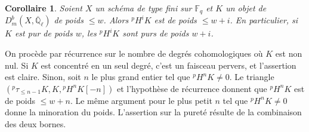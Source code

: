\documentclass[12pt,a4paper]{article}
\theoremstyle{plain}
\newtheorem{corollary}[theorem]{Corollaire}
\theoremstyle{definition}
\begin{document}
\begin{corollary}\label{cor:5.4.7}
Soient $X$ un sch\'{e}ma de type fini sur $\mathbb{F}_{q}$ et $K$ un objet de $D_{m}^{b}(X, \overline{\mathbb{Q}}_{\ell})$ de poids $\leq w$. Alors ${}^{p}H^{i}K$ est de poids $\leq w+i$. En particulier, si $K$ est pur de poids $w$, les ${}^{p}H^{i}K$ sont purs de poids $w+i$.
\end{corollary}

On proc\`{e}de par r\'{e}currence sur le nombre de degr\'{e}s cohomologiques o\`{u} $K$ est non nul. Si $K$ est concentr\'{e} en un seul degr\'{e}, c'est un faisceau pervers, et l'assertion est claire. Sinon, soit $n$ le plus grand entier tel que ${}^{p}H^{n}K \neq 0$. Le triangle $({}^{p}\tau_{\leq n-1}K, K, {}^{p}H^{n}K[-n])$ et l'hypoth\`{e}se de r\'{e}currence donnent que ${}^{p}H^{n}K$ est de poids $\leq w+n$. Le m\^{e}me argument pour le plus petit $n$ tel que ${}^{p}H^{n}K \neq 0$ donne la minoration du poids. L'assertion sur la puret\'{e} r\'{e}sulte de la combinaison des deux bornes.
\end{document}
